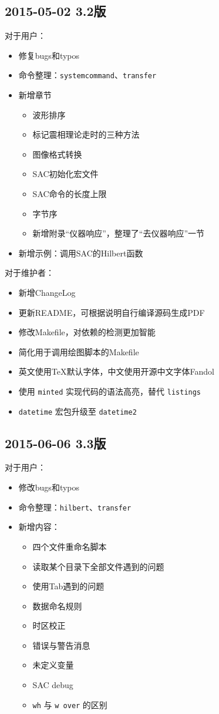 \subsection*{2015-05-02 3.2版}
对于用户：
\begin{itemize}
\item 修复bugs和typos
\item 命令整理：\verb+systemcommand+、\verb+transfer+
\item 新增章节
    \begin{itemize}
    \item 波形排序
    \item 标记震相理论走时的三种方法
    \item 图像格式转换
    \item SAC初始化宏文件
    \item SAC命令的长度上限
    \item 字节序
    \item 新增附录``仪器响应''，整理了``去仪器响应''一节
    \end{itemize}
\item 新增示例：调用SAC的Hilbert函数
\end{itemize}

对于维护者：
\begin{itemize}
\item 新增ChangeLog
\item 更新README，可根据说明自行编译源码生成PDF
\item 修改Makefile，对依赖的检测更加智能
\item 简化用于调用绘图脚本的Makefile
\item 英文使用TeX默认字体，中文使用开源中文字体Fandol
\item 使用 \verb+minted+ 实现代码的语法高亮，替代 \verb+listings+
\item \verb+datetime+ 宏包升级至 \verb+datetime2+
\end{itemize}

\subsection*{2015-06-06 3.3版}
对于用户：
\begin{itemize}
\item 修改bugs和typos
\item 命令整理：\verb+hilbert+、\verb+transfer+
\item 新增内容：
    \begin{itemize}
    \item 四个文件重命名脚本
    \item 读取某个目录下全部文件遇到的问题
    \item 使用Tab遇到的问题
    \item 数据命名规则
    \item 时区校正
    \item 错误与警告消息
    \item 未定义变量
    \item SAC debug
    \item \verb+wh+ 与 \verb+w over+ 的区别
    \end{itemize}
\end{itemize}

